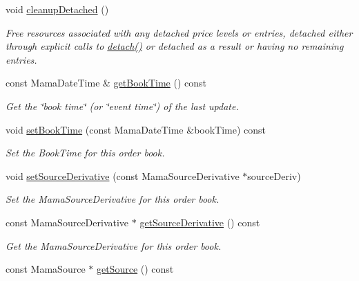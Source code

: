 \begin{CompactItemize}
void \hyperlink{classWombat_1_1MamdaOrderBook_6cce36c4642037f331c39b7a6ab0097f}{cleanup\-Detached} ()
\begin{CompactList}\small\item\em Free resources associated with any detached price levels or entries, detached either through explicit calls to \hyperlink{classWombat_1_1MamdaOrderBook_503c960afbcdea3ddae2d58812a41708}{detach()} or detached as a result or having no remaining entries. \item\end{CompactList}\item 
const Mama\-Date\-Time \& \hyperlink{classWombat_1_1MamdaOrderBook_c0cbfdadb732f7af3a0ee05214ddcc77}{get\-Book\-Time} () const 
\begin{CompactList}\small\item\em Get the \char`\"{}book time\char`\"{} (or \char`\"{}event time\char`\"{}) of the last update. \item\end{CompactList}\item 
void \hyperlink{classWombat_1_1MamdaOrderBook_1607e9bd89db7e33e85733a89a5aee7b}{set\-Book\-Time} (const Mama\-Date\-Time \&book\-Time) const 
\begin{CompactList}\small\item\em Set the Book\-Time for this order book. \item\end{CompactList}\item 
void \hyperlink{classWombat_1_1MamdaOrderBook_10daa10168a2ee4696628fc22679daa3}{set\-Source\-Derivative} (const Mama\-Source\-Derivative $\ast$source\-Deriv)
\begin{CompactList}\small\item\em Set the Mama\-Source\-Derivative for this order book. \item\end{CompactList}\item 
const Mama\-Source\-Derivative $\ast$ \hyperlink{classWombat_1_1MamdaOrderBook_13998c53425af7024b447ccc0c7dc1e9}{get\-Source\-Derivative} () const 
\begin{CompactList}\small\item\em Get the Mama\-Source\-Derivative for this order book. \item\end{CompactList}\item 
const Mama\-Source $\ast$ \hyperlink{classWombat_1_1MamdaOrderBook_57c40a11c3f31d5fee6072f41f13b81a}{get\-Source} () const 

\end{CompactItemize}
